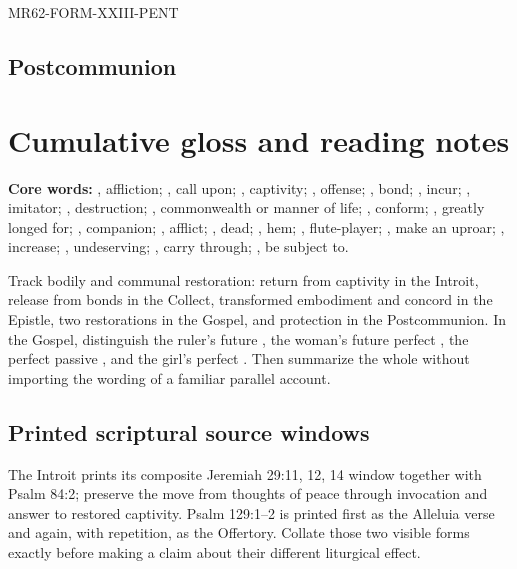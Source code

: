 \begin{reviewsourceunit}{MR62-FORM-XXIII-PENT}
\subsection*{Postcommunion}

\section{Cumulative gloss and reading notes}
\textbf{Core words:} , affliction; , call upon;
, captivity; , offense; , bond;
, incur; , imitator; ,
destruction; , commonwealth or manner of life;
, conform; , greatly longed for;
, companion; , afflict; , dead;
, hem; , flute-player; , make an
uproar; , increase; , undeserving;
, carry through; , be subject to.

Track bodily and communal restoration: return from captivity in the Introit,
release from bonds in the Collect, transformed embodiment and concord in the
Epistle, two restorations in the Gospel, and protection in the Postcommunion.
In the Gospel, distinguish the ruler's future , the woman's future
perfect , the perfect passive , and the
girl's perfect .  Then summarize the whole without importing
the wording of a familiar parallel account.

\subsection*{Printed scriptural source windows}
The Introit prints its composite Jeremiah 29:11, 12, 14 window together with
Psalm 84:2; preserve the move from thoughts of peace through invocation and
answer to restored captivity.  Psalm 129:1--2 is printed first as the Alleluia
verse and again, with repetition, as the Offertory.  Collate those two visible
forms exactly before making a claim about their different liturgical effect.
\end{reviewsourceunit}

